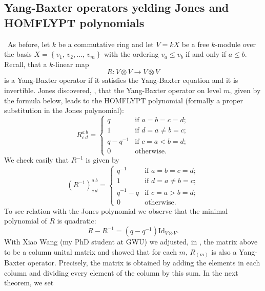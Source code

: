 \documentclass[12pt]{amsart}
\begin{document}
\subsection{Yang-Baxter operators yelding Jones and HOMFLYPT polynomials}\label{YB-H} \ 
As before, let ${k}$ be a commutative ring and let $V={k}X$ be a free ${k}$-module over the basis $X=\left\lbrace  v_{1},\, v_{2}, \dots,\, v_{m} \right\rbrace$ with the ordering $ v_{a}\leq  v_{b}$ if and only if $a \leq b$. Recall, that a ${k}$-linear map 
\begin{equation*}
R: V \otimes V \longrightarrow V\otimes V
\end{equation*}
is a Yang-Baxter operator if it satisfies the Yang-Baxter equation and it is invertible. Jones discovered, \cite{Jon3}, that the Yang-Baxter operator on level $m$, given by the formula below, leads to the HOMFLYPT polynomial (formally a proper substitution in the Jones polynomial):
\begin{equation*}
R_{c \ d}^{a \ b}=
\begin{cases}
q        & \text{if $a=b=c=d;$} \\
1        & \text{if $d=a\neq b=c;$} \\
q-q^{-1}  & \text{if $c=a < b=d;$}\\
0         & \text{otherwise.}
\end{cases}    
\end{equation*}
We check easily that $R^{-1}$ is given by
\begin{equation*}
(R^{-1})_{c \ d}^{a \ b}=
\begin{cases}
q^{-1}        & \text{if $a=b=c=d;$} \\
1        & \text{if $d=a\neq b=c;$} \\
q^{-1}-q  & \text{if $c=a > b=d;$}\\
0         & \text{otherwise.}
\end{cases}
\end{equation*}
To see relation with the Jones polynomial we observe that the minimal polynomial of $R$ is quadratic: 
\begin{equation*}
R-R^{-1}=(q-q^{-1})\mathrm{Id}_{V\otimes V}.  
\end{equation*}
With Xiao Wang (my PhD student at GWU) we adjusted, in \cite{PrWa2}, the matrix above to be a column unital matrix and showed that for each $m$, $R_{(m)}$ is also a Yang-Baxter operator. Precisely, the matrix  is obtained by adding the elements in each column and dividing every element of the column by this sum. In the next theorem, we set 
\end{document}
